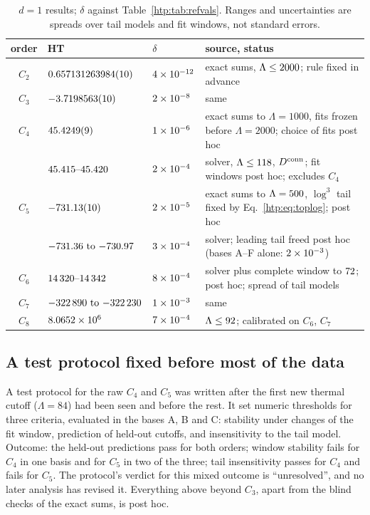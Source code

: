 \begin{table}[ht]
\centering\footnotesize\renewcommand{\arraystretch}{1.25}
\begin{tabular}{@{}cllp{6.5cm}@{}}
\toprule
order & HT & $\delta$ & source, status \\
\midrule
$C_2$ & $0.657131263984(10)$ & $4\times10^{-12}$ & exact sums, $\Lambda\le2000$; rule fixed in advance \\
$C_3$ & $-3.7198563(10)$ & $2\times10^{-8}$ & same \\
$C_4$ & $45.4249(9)$ & $1\times10^{-6}$ & exact sums to $\Lambda=1000$, fits frozen before $\Lambda=2000$; choice of fits post hoc \\
 & $45.415\text{--}45.420$ & $2\times10^{-4}$ & solver, $\Lambda\le118$, $D^{\rm conn}$; fit windows post hoc; excludes $C_4$ \\
$C_5$ & $-731.13(10)$ & $2\times10^{-5}$ & exact sums to $\Lambda=500$, $\log^3$ tail fixed by Eq.~\eqref{htp:eq:toplog}; post hoc \\
 & $-731.36\text{ to }{-730.97}$ & $3\times10^{-4}$ & solver; leading tail freed post hoc (bases A--F alone: $2\times10^{-3}$) \\
$C_6$ & $14\,320\text{--}14\,342$ & $8\times10^{-4}$ & solver plus complete window to $72$; post hoc; spread of tail models \\
$C_7$ & $-322\,890\text{ to }{-322\,230}$ & $1\times10^{-3}$ & same \\
$C_8$ & $8.0652\times10^{6}$ & $7\times10^{-4}$ & $\Lambda\le92$; calibrated on $C_6$, $C_7$ \\
\bottomrule
\end{tabular}
\caption{$d=1$ results; $\delta$ against Table~\ref{htp:tab:refvals}. Ranges and uncertainties are spreads over tail
models and fit windows, not standard errors.}
\label{htp:d1:tab:results}
\end{table}

\subsection{A test protocol fixed before most of the data}
A test protocol for the raw $C_4$ and $C_5$ was written after the first new thermal cutoff ($\Lambda=84$) had been seen
and before the rest. It set numeric thresholds for three criteria, evaluated in the bases A, B and C: stability under
changes of the fit window, prediction of held-out cutoffs, and insensitivity to the tail model. Outcome: the held-out
predictions pass for both orders; window stability fails for $C_4$ in one basis and for $C_5$ in two of the three; tail
insensitivity passes for $C_4$ and fails for $C_5$. The protocol's verdict for this mixed outcome is
``unresolved'', and no later analysis has revised it. Everything above beyond $C_3$, apart from the blind checks of the
exact sums, is post hoc.
